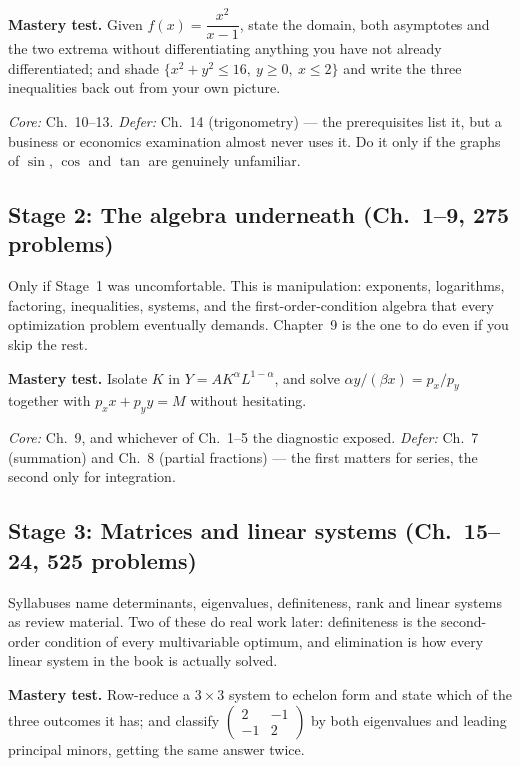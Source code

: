\textbf{Mastery test.} Given $f(x)=\dfrac{x^{2}}{x-1}$, state the domain,
both asymptotes and the two extrema without differentiating anything you
have not already differentiated; and shade
$\{x^{2}+y^{2}\le16,\ y\ge0,\ x\le2\}$ and write the three inequalities back
out from your own picture.

\emph{Core:} Ch.~10--13. \emph{Defer:} Ch.~14 (trigonometry) --- the
prerequisites list it, but a business or economics examination almost never
uses it.
Do it only if the graphs of $\sin$, $\cos$ and $\tan$ are genuinely
unfamiliar.

\subsection*{Stage 2: The algebra underneath (Ch.~1--9, 275 problems)}

Only if Stage~1 was uncomfortable. This is manipulation: exponents,
logarithms, factoring, inequalities, systems, and the first-order-condition
algebra that every optimization problem eventually demands. Chapter~9 is the
one to do even if you skip the rest.

\textbf{Mastery test.} Isolate $K$ in $Y=AK^{\alpha}L^{1-\alpha}$, and solve
$\alpha y/(\beta x)=p_{x}/p_{y}$ together with $p_{x}x+p_{y}y=M$ without
hesitating.

\emph{Core:} Ch.~9, and whichever of Ch.~1--5 the diagnostic exposed.
\emph{Defer:} Ch.~7 (summation) and Ch.~8 (partial fractions) --- the first
matters for series, the second only for integration.

\subsection*{Stage 3: Matrices and linear systems (Ch.~15--24, 525 problems)}

Syllabuses name determinants, eigenvalues, definiteness, rank and linear
systems as review material. Two of these do real work later: definiteness is
the second-order condition of every multivariable optimum, and elimination
is how every linear system in the book is actually solved.

\textbf{Mastery test.} Row-reduce a $3\times3$ system to echelon form and
state which of the three outcomes it has; and classify
$\left(\begin{smallmatrix}2&-1\\-1&2\end{smallmatrix}\right)$ by both
eigenvalues and leading principal minors, getting the same answer twice.


